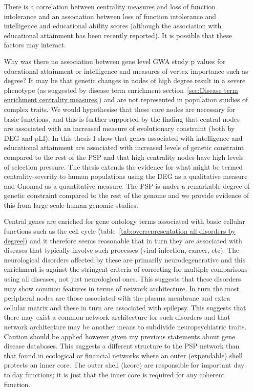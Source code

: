 There is a correlation between centrality measures and loss of function intolerance and an association between loss of function intolerance and intelligence and educational ability scores (although the association with educational attainment has been recently reported\cite{karczewski2020mutational}). It is possible that these factors may interact. 

Why was there no association between gene level GWA study p values for educational attainment or intelligence and measures of vertex importance such as degree? It may be that genetic changes in nodes of high degree result in a severe phenotype (as suggested by disease term enrichment section~\ref{sec:Disease term enrichment centrality measures}) and are not represented in population studies of complex traits. We would hypothesise that these core nodes are necessary for basic functions, and this is further supported by the finding that central nodes  are associated with an increased measure of evolutionary constraint (both by DEG and pLI). In this thesis I show that genes associated with intelligence and educational attainment are associated with increased levels of genetic constraint compared to the rest of the PSP and that high centrality nodes have high levels of selection pressure. The thesis extends the evidence for what might be termed centrality-severity to human populations using the DEG as a qualitative measure and Gnomad as a quantitative measure. The PSP is under a remarkable degree of genetic constraint compared to the rest of the genome and we provide evidence of this from large scale human genomic studies. 


Central genes are enriched for gene ontology terms associated with basic cellular functions such as the cell cycle (table~\ref{tab:overrepresentation all disorders by degree}) and it therefore seems reasonable that in turn they are associated with diseases that typically involve such processes (viral infection, cancer, etc). The neurological disorders affected by these are primarily neurodegenerative  and this enrichment is against the stringent criteria of correcting for multiple comparisons using all diseases, not just neurological ones. This suggests that these disorders may show common features in terms of network architecture. In turn the most peripheral nodes are those associated with the plasma membrane and extra cellular matrix and these in turn are associated with epilepsy. This suggests that there may exist a common network architecture for such disorders and that network architecture may be another means to subdivide neuropsychiatric traits. Caution should be applied however given my previous statements about gene disease databases. This suggests a different structure to the PSP network than that found in ecological or financial networks where an outer (expendable) shell protects an inner core\cite{burleson2020k}. The outer shell (kcore) are responsible for important day to day functions; it is just that the inner core is required for any coherent function. 

